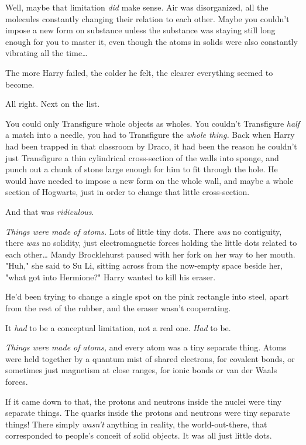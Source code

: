 Well, maybe that limitation \emph{did} make sense. Air was disorganized, all 
the molecules constantly changing their relation to each other. Maybe you 
couldn't impose a new form on substance unless the substance was staying still 
long enough for you to master it, even though the atoms in solids were also 
constantly vibrating all the time{\ldots}

The more Harry failed, the colder he felt, the clearer everything seemed to 
become.

All right. Next on the list.

You could only Transfigure whole objects as wholes. You couldn't Transfigure 
\emph{half} a match into a needle, you had to Transfigure the \emph{whole 
thing.} Back when Harry had been trapped in that classroom by Draco, it had 
been the reason he couldn't just Transfigure a thin cylindrical cross-section 
of the walls into sponge, and punch out a chunk of stone large enough for him 
to fit through the hole. He would have needed to impose a new form on the whole 
wall, and maybe a whole section of Hogwarts, just in order to change that 
little cross-section.

And that was \emph{ridiculous}.

\emph{Things were made of atoms.} Lots of little tiny dots. There \emph{was} no 
contiguity, there \emph{was} no solidity, just electromagnetic forces holding 
the little dots related to each other{\ldots}
\sbreak
Mandy Brocklehurst paused with her fork on her way to her mouth. "Huh," she 
said to Su Li, sitting across from the now-empty space beside her, "what got 
into Hermione?"
\sbreak
Harry wanted to kill his eraser.

He'd been trying to change a single spot on the pink rectangle into steel, 
apart from the rest of the rubber, and the eraser wasn't cooperating.

It \emph{had} to be a conceptual limitation, not a real one. \emph{Had} to be.

\emph{Things were made of atoms,} and every atom was a tiny separate thing. 
Atoms were held together by a quantum mist of shared electrons, for covalent 
bonds, or sometimes just magnetism at close ranges, for ionic bonds or van der 
Waals forces.

If it came down to that, the protons and neutrons inside the nuclei were tiny 
separate things. The quarks inside the protons and neutrons were tiny separate 
things! There simply \emph{wasn't} anything in reality, the world-out-there, 
that corresponded to people's conceit of solid objects. It was all just little 
dots.


